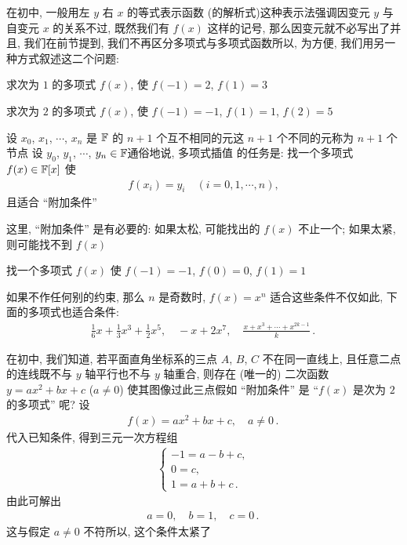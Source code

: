 在初中, 一般用左 $y$ 右 $x$ 的等式表示函数 (的解析式)\period 这种表示法强调因变元  $y$ 与自变元  $x$ 的关系\period 不过, 既然我们有 $f(x)$ 这样的记号, 那么因变元就不必写出了\period 并且, 我们在前节提到, 我们不再区分多项式与多项式函数\period 所以, 为方便, 我们用另一种方式叙述这二个问题:

\begin{example}
    求次为 $1$ 的多项式 $f(x)$, 使 $f(-1)=2$, $f(1)=3$\period
\end{example}

\begin{example}
    求次为 $2$ 的多项式 $f(x)$, 使 $f(-1)=-1$, $f(1)=1$, $f(2)=5$\period
\end{example}

设 $x_0$, $x_1$, $\cdots$, $x_{n}$ 是 $\mathbb{F}$ 的 $n+1$ 个互不相同的元\period 这 $n+1$ 个不同的元称为 $n+1$ 个节点 \period 设 $y_0$, $y_1$, $\cdots$, $y_{n} \in \mathbb{F}$\period 通俗地说, 多项式插值  的任务是: 找一个多项式 $f(x) \in \mathbb{F}[x]$ 使
\begin{align*}
    f(x_i) = y_i \quad (i = 0,1,\cdots,n),
\end{align*}
且适合 ``附加条件''\period

这里, ``附加条件'' 是有必要的: 如果太松, 可能找出的 $f(x)$ 不止一个; 如果太紧, 则可能找不到 $f(x)$\period

\begin{example}
    找一个多项式 $f(x)$ 使 $f(-1)=-1$, $f(0)=0$, $f(1)=1$\period

    如果不作任何别的约束, 那么 $n$ 是奇数时, $f(x) = x^n$ 适合这些条件\period 不仅如此, 下面的多项式也适合条件:
    \begin{align*}
        \frac{1}{6}x + \frac{1}{3}x^3 + \frac{1}{2}x^5, \quad -x + 2x^7, \quad \frac{x + x^3 + \cdots + x^{2k-1}}{k} \period
    \end{align*}

    在初中, 我们知道, 若平面直角坐标系的三点 $A$, $B$, $C$ 不在同一直线上, 且任意二点的连线既不与 $y$ 轴平行也不与 $y$ 轴重合, 则存在 (唯一的) 二次函数 $y = ax^2 + bx + c$ ($a \neq 0$) 使其图像过此三点\period 假如 ``附加条件'' 是 ``$f(x)$ 是次为 $2$ 的多项式'' 呢? 设
    \begin{align*}
        f(x) = ax^2 + bx + c, \quad a \neq 0 \period
    \end{align*}
    代入已知条件, 得到三元一次方程组
    \begin{align*}
        \begin{cases}
            -1 = a - b + c, \\
            0 = c,          \\
            1 = a + b + c \period
        \end{cases}
    \end{align*}
    由此可解出
    \begin{align*}
        a = 0, \quad b = 1, \quad c = 0 \period
    \end{align*}
    这与假定 $a \neq 0$ 不符\period 所以, 这个条件太紧了\period
\end{example}

